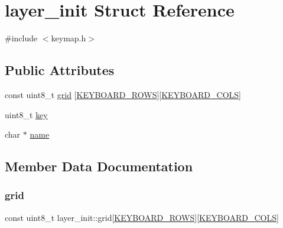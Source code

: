 \hypertarget{structlayer__init}{}\section{layer\+\_\+init Struct Reference}
\label{structlayer__init}


{\ttfamily \#include $<$keymap.\+h$>$}

\subsection*{Public Attributes}
\begin{DoxyCompactItemize}
\item 
const uint8\+\_\+t \hyperlink{structlayer__init_a54dc9ff947e40d2629061c3f7ccf7620}{grid} \mbox{[}\hyperlink{keymap_8h_ab89c69b09d4ca01020b7c40d9ca2bab8}{K\+E\+Y\+B\+O\+A\+R\+D\+\_\+\+R\+O\+WS}\mbox{]}\mbox{[}\hyperlink{keymap_8h_ada65ea6a2010790e481acf033b2f8351}{K\+E\+Y\+B\+O\+A\+R\+D\+\_\+\+C\+O\+LS}\mbox{]}
\item 
uint8\+\_\+t \hyperlink{structlayer__init_a64c998b9c2c7a1021a7cabe1179bfd0d}{key}
\item 
char $\ast$ \hyperlink{structlayer__init_a19f2d1d9aa1c2beccc6f6ea8fec0f8b4}{name}
\end{DoxyCompactItemize}


\subsection{Member Data Documentation}
\mbox{\label{structlayer__init_a54dc9ff947e40d2629061c3f7ccf7620}} 
\subsubsection{\texorpdfstring{grid}{grid}}
{\footnotesize\ttfamily const uint8\+\_\+t layer\+\_\+init\+::grid\mbox{[}\hyperlink{keymap_8h_ab89c69b09d4ca01020b7c40d9ca2bab8}{K\+E\+Y\+B\+O\+A\+R\+D\+\_\+\+R\+O\+WS}\mbox{]}\mbox{[}\hyperlink{keymap_8h_ada65ea6a2010790e481acf033b2f8351}{K\+E\+Y\+B\+O\+A\+R\+D\+\_\+\+C\+O\+LS}\mbox{]}}

\mbox{\label{structlayer__init_a64c998b9c2c7a1021a7cabe1179bfd0d}} 
